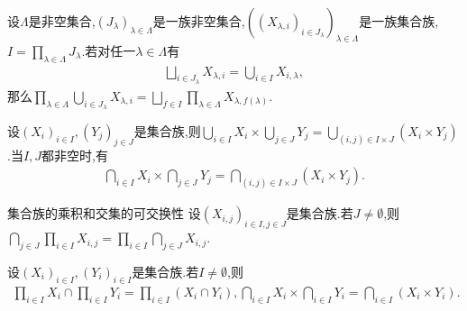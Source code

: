\begin{corollary}{}{}
	设$\Lambda$是非空集合,$\left(J_{\lambda}\right)_{\lambda\in\Lambda}$是一族非空集合,$\left(\left(X_{\lambda,i}\right)_{i\in J_{\lambda}}\right)_{\lambda\in\Lambda}$是一族集合族,$I=\prod\limits_{\lambda\in\Lambda}J_{\lambda}$.若对任一$\lambda\in\Lambda$有
	\begin{align*}
		\bigsqcup\limits_{i\in J_{\lambda}}X_{\lambda,i}=\bigcup\limits_{i\in I}X_{i,\lambda},
	\end{align*}
	那么$\prod\limits_{\lambda\in\Lambda}\bigcup\limits_{i\in J_{\lambda}}X_{\lambda,i}=\bigsqcup\limits_{f\in I}\prod\limits_{\lambda\in\Lambda}X_{\lambda,f\left(\lambda\right)}$.
\end{corollary}

\begin{corollary}{}{}
	设$\left(X_{i}\right)_{i\in I},\left(Y_{j}\right)_{j\in J}$是集合族,则$\bigcup\limits_{i\in I}X_{i}\times\bigcup\limits_{j\in J}Y_{j}=\bigcup\limits_{\left(i,j\right)\in I\times J}\left(X_{i}\times Y_{j}\right)$.当$I,J$都非空时,有
	\begin{align*}
		\bigcap\limits_{i\in I}X_{i}\times\bigcap\limits_{j\in J}Y_{j}=\bigcap\limits_{\left(i,j\right)\in I\times J}\left(X_{i}\times Y_{j}\right).
	\end{align*}
\end{corollary}

\begin{proposition}{集合族的乘积和交集的可交换性}{}
	设$\left(X_{i,j}\right)_{i\in I,j\in J}$是集合族.若$J\neq\emptyset$,则$\bigcap\limits_{j\in J}\prod\limits_{i\in I}X_{i,j}=\prod\limits_{i\in I}\bigcap\limits_{j\in J}X_{i,j}$.
\end{proposition}

\begin{corollary}{}{}
	设$\left(X_{i}\right)_{i\in I},\left(Y_{i}\right)_{i\in I}$是集合族.若$I\neq\emptyset$,则
	\begin{align*}
		\prod\limits_{i\in I}X_{i}\cap\prod\limits_{i\in I}Y_{i}=\prod\limits_{i\in I}\left(X_{i}\cap Y_{i}\right),\bigcap\limits_{i\in I}X_{i}\times\bigcap\limits_{i\in I}Y_{i}=\bigcap\limits_{i\in I}\left(X_{i}\times Y_{i}\right).
	\end{align*}
\end{corollary}




















